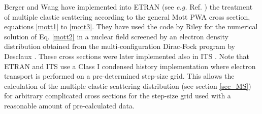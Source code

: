 Berger and Wang \cite{BW89} have implemented into ETRAN (see {\em e.g.}
Ref. \cite{Se89})
the treatment of multiple
elastic scattering according to the general Mott PWA cross section,
equations \eqref{mott1} to \eqref{mott3}. They have used the code
by Riley \cite{Ri74} for the numerical solution of Eq. \eqref{mott2}
in a nuclear field screened by an electron density distribution
obtained from the multi-configuration Dirac-Fock program by
Desclaux \cite{De75}. These cross sections were later implemented
also in ITS \cite{ITSV3}. Note that ETRAN and ITS use a Class I
condensed history implementation where electron transport is
performed on  a pre-determined step-size grid. This allows
the calculation of the multiple elastic scattering distribution
(see section \ref{sec_MS}) for arbitrary complicated cross
sections for the step-size grid used with a reasonable amount
of pre-calculated data.

